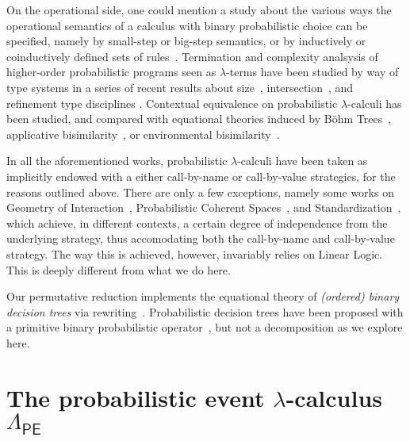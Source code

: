 \documentclass{llncs}
\theoremstyle{definition}
\theoremstyle{plain}
\newcommand\PEL{\Lambda_{\textsf{PE}}}
\newcommand\+[1][{}]{\kern1pt{\smallbin\oplus}_{#1}\kern1pt}
\begin{document}
On the operational side, one could mention a study about the various ways the operational semantics of a calculus with binary probabilistic choice can be specified, namely by small-step or big-step semantics, or by inductively or coinductively defined sets of rules~\cite{DalLagoZorzi12}. Termination and complexity analsysis of higher-order probabilistic programs seen as $\lambda$-terms have been studied by way of type systems in a series of recent results about size~\cite{DalLagoGrellois19}, intersection~\cite{BreuvartDalLago18}, and refinement type disciplines \cite{AvanziniDalLagoGhyselen19}. Contextual equivalence on probabilistic $\lambda$-calculi has been studied, and compared with equational theories induced by B\"ohm Trees~\cite{Leventis18}, applicative bisimilarity~\cite{DalLagoSangiorgiAlberti14}, or environmental bisimilarity~\cite{SangiorgiVignudelli16}.

In all the aforementioned works, probabilistic $\lambda$-calculi have been taken as implicitly endowed with a either call-by-name or call-by-value strategies, for the reasons outlined above. There are only a few exceptions, namely some works on Geometry of Interaction~\cite{DLFVY17}, Probabilistic Coherent Spaces~\cite{EhrhardTasson19}, and Standardization~\cite{FaggianRonchi19}, which achieve, in different contexts, a certain degree of independence from the underlying strategy, thus accomodating both the call-by-name and call-by-value strategy. The way this is achieved, however, invariably relies on Linear Logic. This is deeply different from what we do here.


Our permutative reduction implements the equational theory of \emph{(ordered) binary decision trees} via rewriting~\cite{Zantema-Pol-2001}. Probabilistic decision trees have been proposed with a primitive binary probabilistic operator~\cite{Manber-Tompa-1982}, but not a decomposition as we explore here.



\section{\texorpdfstring{The probabilistic event $\lambda$-calculus $\PEL$}{The probabilistic event lambda-claculus PEL}}
\label{sec:PEL}
\end{document}
